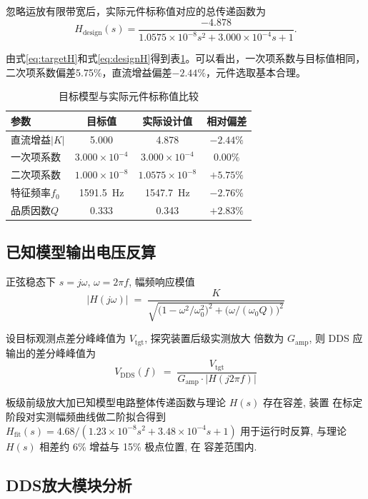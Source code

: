 \documentclass[a4paper]{article}
\begin{document}
忽略运放有限带宽后，实际元件标称值对应的总传递函数为
\begin{equation}
H_{\mathrm{design}}(s)=\frac{-4.878}{1.0575\times10^{-8}s^2+3.000\times10^{-4}s+1}.
\label{eq:designH}
\end{equation}

由式\eqref{eq:targetH}和式\eqref{eq:designH}得到表\ref{tab:paramcompare}。可以看出，一次项系数与目标值相同，二次项系数偏差5.75\%，直流增益偏差$-2.44\%$，元件选取基本合理。

\begin{table}[H]
\centering
\caption{目标模型与实际元件标称值比较}
\label{tab:paramcompare}
\begin{tabular}{lccc}
\toprule
参数 & 目标值 & 实际设计值 & 相对偏差 \\
\midrule
直流增益$|K|$ & 5.000 & 4.878 & $-2.44\%$ \\
一次项系数 & $3.000\times10^{-4}$ & $3.000\times10^{-4}$ & $0.00\%$ \\
二次项系数 & $1.000\times10^{-8}$ & $1.0575\times10^{-8}$ & $+5.75\%$ \\
特征频率$f_0$ & 1591.5~Hz & 1547.7~Hz & $-2.76\%$ \\
品质因数$Q$ & 0.333 & 0.343 & $+2.83\%$ \\
\bottomrule
\end{tabular}
\end{table}

\subsection{已知模型输出电压反算}

正弦稳态下 $s = j\omega$, $\omega = 2\pi f$, 幅频响应模值
\[
|H(j\omega)| \;=\;
\frac{K}{\sqrt{\bigl(1 - \omega^{2}/\omega_{0}^{2}\bigr)^{2}
       + \bigl(\omega/(\omega_{0}Q)\bigr)^{2}}}
\]

设目标观测点差分峰峰值为 $V_{\mathrm{tgt}}$, 探究装置后级实测放大
倍数为 $G_{\mathrm{amp}}$, 则 DDS 应输出的差分峰峰值为
\[
V_{\mathrm{DDS}}(f) \;=\; \frac{V_{\mathrm{tgt}}}
                                 {G_{\mathrm{amp}} \cdot |H(j2\pi f)|}
\]

板级前级放大加已知模型电路整体传递函数与理论 $H(s)$ 存在容差, 装置
在标定阶段对实测幅频曲线做二阶拟合得到
$H_{\mathrm{fit}}(s) = 4.68 / (1.23\!\times\!10^{-8}s^{2}
+ 3.48\!\times\!10^{-4}s + 1)$
用于运行时反算, 与理论 $H(s)$ 相差约 6\% 增益与 15\% 极点位置, 在
容差范围内.

\subsection{DDS放大模块分析}
\end{document}
